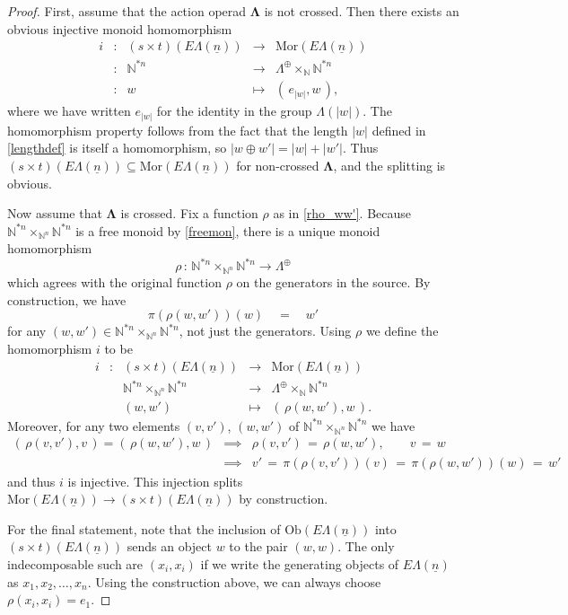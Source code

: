 \documentclass{amsbook} %
\newcommand{\ML}{\mathbf{\Lambda}}
\newcommand{\lop}{\Lambda^{\oplus}}
\newcommand{\ELn}{E\Lambda(\underline{n})}
\numberwithin{section}{chapter}
\begin{document}
\begin{proof}
First, assume that the action operad $\ML$ is not crossed. Then there exists an obvious injective monoid homomorphism
\[ \begin{array}{rlrll}
			i & : & (s \times t)(\ELn) & \to & \mathrm{Mor}(\ELn) \\
			& : & \mathbb{N}^{\ast n} & \to & \lop \times_{\mathbb{N}} \mathbb{N}^{\ast n} \\
			& : & w & \mapsto & ( \, e_{|w|}, w \, ),
		\end{array}
\]
where we have written $e_{|w|}$ for the identity in the group $\Lambda(|w|)$. The homomorphism property follows from the fact that the length $|w|$ defined in \cref{lengthdef} is itself a homomorphism, so $|w \oplus w'| = |w|+|w'|$. Thus $(s \times t)(\ELn) \subseteq \mathrm{Mor}(\ELn)$ for non-crossed $\ML$, and the splitting is obvious.

Now assume that $\ML$ is crossed. Fix a function $\rho$ as in \cref{rho_ww'}. Because $\mathbb{N}^{\ast n} \times_{\mathbb{N}^n} \mathbb{N}^{\ast n}$ is a free monoid  by \cref{freemon}, there is a unique monoid homomorphism
\[ \rho \, : \, \mathbb{N}^{\ast n} \times_{\mathbb{N}^n} \mathbb{N}^{\ast n} \longrightarrow \lop \]
which agrees with the original function $\rho$ on the generators in the source. By construction, we have
\[ \pi(\rho(w, w'))(w) \quad = \quad w' \]
for any $(w, w') \in\mathbb{N}^{\ast n} \times_{\mathbb{N}^n} \mathbb{N}^{\ast n}$, not just the generators. Using $\rho$ we define the homomorphism $i$ to be
\[ \begin{array}{rlrll}
			i & : & (s \times t)(\ELn) & \to & \mathrm{Mor}(\ELn) \\
			&  & \mathbb{N}^{\ast n} \times_{\mathbb{N}^n} \mathbb{N}^{\ast n} & \to & \lop \times_{\mathbb{N}} \mathbb{N}^{\ast n} \\
			&  & (w, w') & \mapsto & ( \, \rho(w, w'), w \, ).
		\end{array}
\]
Moreover, for any two elements $(v, v')$, $(w, w')$ of $\mathbb{N}^{\ast n} \times_{\mathbb{N}^n} \mathbb{N}^{\ast n}$ we have
\[ \begin{array}{lcl}
		( \, \rho(v, v'), v \, )  =  ( \, \rho(w, w'), w \, ) & \implies & \rho(v, v') \, = \, \rho(w, w'), \quad \quad v \, = \, w \\
		 & \implies & v' \, = \, \pi(\rho(v, v'))(v) \, = \, \pi(\rho(w, w'))(w) \, = \, w'
		\end{array}
\]
and thus $i$ is injective. This injection splits $\mathrm{Mor}(\ELn) \to (s \times t)(\ELn)$ by construction.

For the final statement, note that the inclusion of $\mathrm{Ob}(\ELn)$ into $(s \times t)(\ELn)$ sends an object $w$ to the pair $(w,w)$. The only indecomposable such are $(x_i, x_i)$ if we write the generating objects of $\ELn$ as $x_1, x_2, \ldots, x_n$. Using the construction above, we can always choose $\rho(x_i, x_i) = e_1$.
\end{proof}
\end{document}
